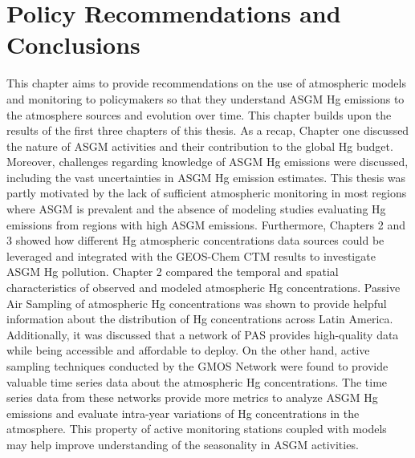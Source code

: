 
\chapter{Policy Recommendations and Conclusions}
\begin{flushleft}
    
This chapter aims to provide recommendations on the use of atmospheric models and monitoring to policymakers so that they understand ASGM Hg emissions to the atmosphere sources and evolution over time. This chapter builds upon the results of the first three chapters of this thesis. As a recap, Chapter one discussed the nature of ASGM activities and their contribution to the global Hg budget. Moreover, challenges regarding knowledge of ASGM Hg emissions were discussed, including the vast uncertainties in ASGM Hg emission estimates. This thesis was partly motivated by the lack of sufficient atmospheric monitoring in most regions where ASGM is prevalent and the absence of modeling studies evaluating Hg emissions from regions with high ASGM emissions.
Furthermore, Chapters 2 and 3 showed how different Hg atmospheric concentrations data sources could be leveraged and integrated with the GEOS-Chem CTM results to investigate ASGM Hg pollution. Chapter 2 compared the temporal and spatial characteristics of observed and modeled atmospheric Hg concentrations. Passive Air Sampling of atmospheric Hg concentrations was shown to provide helpful information about the distribution of Hg concentrations across Latin America. Additionally, it was discussed that a network of PAS provides high-quality data while being accessible and affordable to deploy. On the other hand, active sampling techniques conducted by the GMOS Network were found to provide valuable time series data about the atmospheric Hg concentrations. The time series data from these networks provide more metrics to analyze ASGM Hg emissions and evaluate intra-year variations of Hg concentrations in the atmosphere. This property of active monitoring stations coupled with models may help improve understanding of the seasonality in ASGM activities. 
\end{flushleft}
